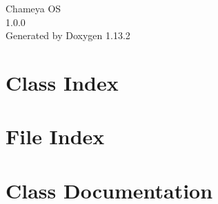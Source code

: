 \documentclass[twoside]{book}
\newcommand{\+}{\discretionary{\mbox{\scriptsize$\hookleftarrow$}}{}{}}
\newcommand{\clearemptydoublepage}{%
    \newpage{\pagestyle{empty}\cleardoublepage}%
  }
\begin{document}
  \raggedbottom
    \hypersetup{pageanchor=false,
                bookmarksnumbered=true,
                pdfencoding=unicode
               }
  \begin{titlepage}
  \vspace*{7cm}
  \begin{center}%
  {\Large Chameya OS}\\
  [1ex]\large 1.\+0.\+0 \\
  \vspace*{1cm}
  {\large Generated by Doxygen 1.13.2}\\
  \end{center}
  \end{titlepage}
  \clearemptydoublepage
  \tableofcontents
  \clearemptydoublepage
  \hypersetup{pageanchor=true}
\chapter{Class Index}

\chapter{File Index}

\chapter{Class Documentation}





















\end{document}
